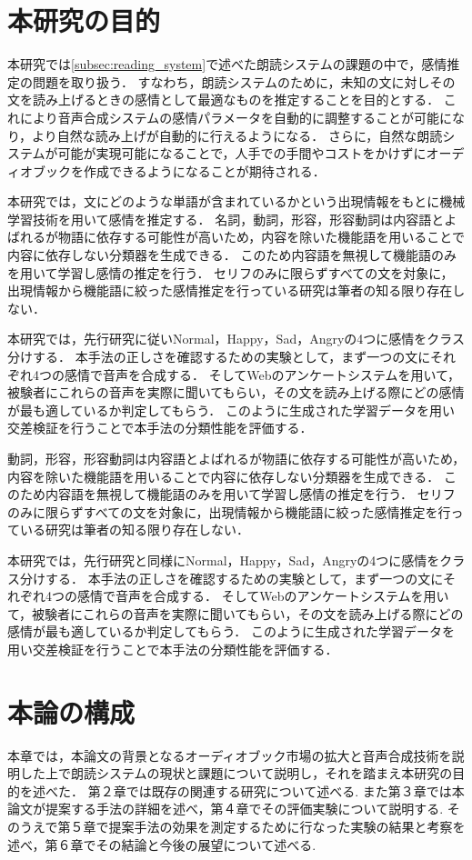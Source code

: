 \section{本研究の目的}
本研究では\ref{subsec:reading_system}で述べた朗読システムの課題の中で，感情推定の問題を取り扱う．
すなわち，朗読システムのために，未知の文に対しその文を読み上げるときの感情として最適なものを推定することを目的とする．
これにより音声合成システムの感情パラメータを自動的に調整することが可能になり，より自然な読み上げが自動的に行えるようになる．
さらに，自然な朗読システムが可能が実現可能になることで，人手での手間やコストをかけずにオーディオブックを作成できるようになることが期待される．


本研究では，文にどのような単語が含まれているかという出現情報をもとに機械学習技術を用いて感情を推定する．
名詞，動詞，形容，形容動詞は内容語とよばれるが物語に依存する可能性が高いため，内容を除いた機能語を用いることで内容に依存しない分類器を生成できる．
このため内容語を無視して機能語のみを用いて学習し感情の推定を行う．
セリフのみに限らずすべての文を対象に，出現情報から機能語に絞った感情推定を行っている研究は筆者の知る限り存在しない．


本研究では，先行研究に従いNormal，Happy，Sad，Angryの4つに感情をクラス分けする．
本手法の正しさを確認するための実験として，まず一つの文にそれぞれ4つの感情で音声を合成する．
そしてWebのアンケートシステムを用いて，被験者にこれらの音声を実際に聞いてもらい，その文を読み上げる際にどの感情が最も適しているか判定してもらう．
このように生成された学習データを用い交差検証を行うことで本手法の分類性能を評価する．


動詞，形容，形容動詞は内容語とよばれるが物語に依存する可能性が高いため，内容を除いた機能語を用いることで内容に依存しない分類器を生成できる．
このため内容語を無視して機能語のみを用いて学習し感情の推定を行う．
セリフのみに限らずすべての文を対象に，出現情報から機能語に絞った感情推定を行っている研究は筆者の知る限り存在しない．


本研究では，先行研究と同様にNormal，Happy，Sad，Angryの4つに感情をクラス分けする．
本手法の正しさを確認するための実験として，まず一つの文にそれぞれ4つの感情で音声を合成する．
そしてWebのアンケートシステムを用いて，被験者にこれらの音声を実際に聞いてもらい，その文を読み上げる際にどの感情が最も適しているか判定してもらう．
このように生成された学習データを用い交差検証を行うことで本手法の分類性能を評価する．

\section{本論の構成}
本章では，本論文の背景となるオーディオブック市場の拡大と音声合成技術を説明した上で朗読システムの現状と課題について説明し，それを踏まえ本研究の目的を述べた．
第２章では既存の関連する研究について述べる.
また第３章では本論文が提案する手法の詳細を述べ，第４章でその評価実験について説明する.
そのうえで第５章で提案手法の効果を測定するために行なった実験の結果と考察を述べ，第６章でその結論と今後の展望について述べる.

